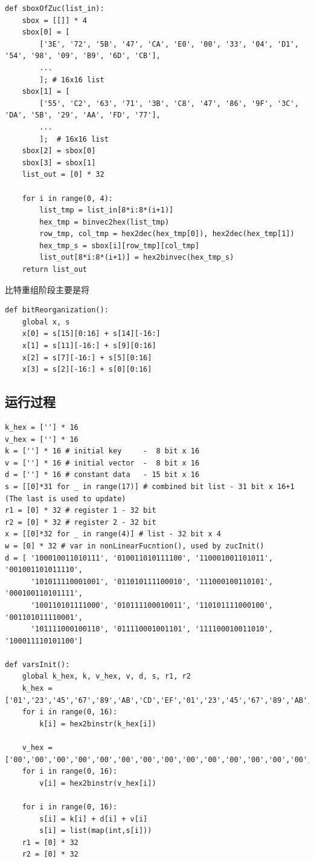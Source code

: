 \begin{lstlisting}[style=myPython,label={lst:sboxofzuc},caption={S 盒置换函数}]
def sboxOfZuc(list_in):
    sbox = [[]] * 4
    sbox[0] = [
        ['3E', '72', '5B', '47', 'CA', 'E0', '00', '33', '04', 'D1', '54', '98', '09', 'B9', '6D', 'CB'], 
        ...
        ]; # 16x16 list
    sbox[1] = [
        ['55', 'C2', '63', '71', '3B', 'C8', '47', '86', '9F', '3C', 'DA', '5B', '29', 'AA', 'FD', '77'], 
        ...
        ];  # 16x16 list
    sbox[2] = sbox[0]
    sbox[3] = sbox[1]
    list_out = [0] * 32

    for i in range(0, 4):
        list_tmp = list_in[8*i:8*(i+1)]
        hex_tmp = binvec2hex(list_tmp)
        row_tmp, col_tmp = hex2dec(hex_tmp[0]), hex2dec(hex_tmp[1])
        hex_tmp_s = sbox[i][row_tmp][col_tmp]
        list_out[8*i:8*(i+1)] = hex2binvec(hex_tmp_s)
    return list_out
\end{lstlisting}


比特重组阶段主要是将


\begin{lstlisting}[style=myPython,label={lst:bitreorganization},caption={比特重组}]
def bitReorganization():
    global x, s
    x[0] = s[15][0:16] + s[14][-16:]
    x[1] = s[11][-16:] + s[9][0:16]
    x[2] = s[7][-16:] + s[5][0:16]
    x[3] = s[2][-16:] + s[0][0:16]
\end{lstlisting}


\subsection{运行过程}

\begin{lstlisting}[style=myPython,label={lst:varinit},caption={变量初始化}]
k_hex = [''] * 16
v_hex = [''] * 16
k = [''] * 16 # initial key     -  8 bit x 16
v = [''] * 16 # initial vector  -  8 bit x 16
d = [''] * 16 # constant data   - 15 bit x 16
s = [[0]*31 for _ in range(17)] # combined bit list - 31 bit x 16+1 (The last is used to update)
r1 = [0] * 32 # register 1 - 32 bit
r2 = [0] * 32 # register 2 - 32 bit
x = [[0]*32 for _ in range(4)] # list - 32 bit x 4
w = [0] * 32 # var in nonLinearFucntion(), used by zucInit()
d = [ '100010011010111', '010011010111100', '110001001101011', '001001101011110',
      '101011110001001', '011010111100010', '111000100110101', '000100110101111',
      '100110101111000', '010111100010011', '110101111000100', '001101011110001',
      '101111000100110', '011110001001101', '111100010011010', '100011110101100']

def varsInit():
    global k_hex, k, v_hex, v, d, s, r1, r2
    k_hex = ['01','23','45','67','89','AB','CD','EF','01','23','45','67','89','AB','CD','EF']
    for i in range(0, 16):
        k[i] = hex2binstr(k_hex[i])

    v_hex = ['00','00','00','00','00','00','00','00','00','00','00','00','00','00','00','00']
    for i in range(0, 16):
        v[i] = hex2binstr(v_hex[i])

    for i in range(0, 16):
        s[i] = k[i] + d[i] + v[i]
        s[i] = list(map(int,s[i]))
    r1 = [0] * 32
    r2 = [0] * 32

\end{lstlisting}

